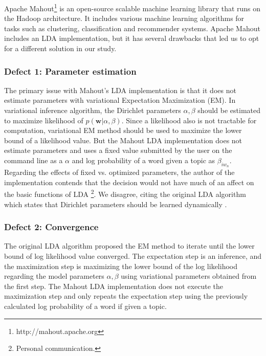 \documentclass{sig-alternate}
\begin{document}
Apache Mahout\footnote{http://mahout.apache.org} is an open-source scalable machine learning library that runs on the Hadoop architecture. It includes various machine learning algorithms for tasks such as clustering, classification and recommender systems. Apache Mahout includes an LDA implementation, but it has several drawbacks that led us to opt for a different solution in our study.

\subsubsection{Defect 1: Parameter estimation}
The primary issue with Mahout's LDA implementation is that it does not estimate parameters with variational Expectation Maximization (EM). In variational inference algorithm, the Dirichlet parameters $\alpha, \beta$ should be estimated to maximize likelihood of $p(\mathbf{w}|\alpha,\beta)$. Since a likelihood also is not tractable for computation, variational EM method should be used to maximize the lower bound of a likelihood value. But the Mahout LDA implementation does not estimate parameters and uses a fixed value submitted by the user on the command line as a $\alpha$ and log probability of a word given a topic as $\beta_{iw_n}$. Regarding the effects of fixed vs. optimized parameters, the author of the implementation contends that the decision would not have much of an affect on the basic functions of LDA \footnote{Personal communication.}. We disagree, citing the original LDA algorithm which states that Dirichlet parameters should be learned dynamically \cite{Blei2003a}.

\subsubsection{Defect 2: Convergence}
The original LDA algorithm proposed the EM method to iterate until the lower bound of log likelihood value converged. The expectation step is an inference, and the maximization step is maximizing the lower bound of the log likelihood regarding the model parameters $\alpha, \beta$ using variational parameters obtained from the first step. The Mahout LDA implementation does not execute the maximization step and only repeats the expectation step using the previously calculated log probability of a word if given a topic.
\end{document}
